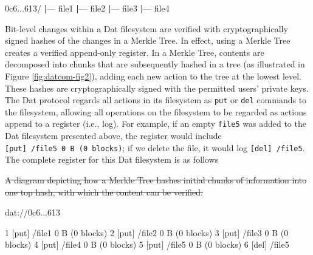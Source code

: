 \documentclass[publications,article,submit,moreauthors,pdftex,10pt,a4paper]{Definitions/mdpi}
\newenvironment{Shaded}{\begin{snugshade}}{\end{snugshade}}
\newcommand{\ExtensionTok}[1]{#1}
\newcommand{\KeywordTok}[1]{\textcolor[rgb]{0.13,0.29,0.53}{\textbf{#1}}}
\newcommand{\NormalTok}[1]{#1}
\providecommand{\DIFaddtex}[1]{{\protect\color{blue}\uwave{#1}}} %
\providecommand{\DIFdeltex}[1]{{\protect\color{red}\sout{#1}}}                      %
\providecommand{\DIFaddbegin}{} %
\providecommand{\DIFaddend}{} %
\providecommand{\DIFdelbegin}{} %
\providecommand{\DIFdelend}{} %
\providecommand{\DIFdelFL}[1]{\DIFdel{#1}} %
\providecommand{\DIFadd}[1]{\texorpdfstring{\DIFaddtex{#1}}{#1}} %
\providecommand{\DIFdel}[1]{\texorpdfstring{\DIFdeltex{#1}}{}} %
\newcommand{\DIFscaledelfig}{0.5}
\newlength{\DIFdelgraphicswidth} %
\newlength{\DIFdelgraphicsheight} %
\newcommand{\DIFaddincludegraphics}[2][]{{\color{blue}\fbox{\DIFOincludegraphics[#1]{#2}}}} %
\newcommand{\DIFdelincludegraphics}[2][]{%
\sbox{\DIFdelgraphicsbox}{\DIFOincludegraphics[#1]{#2}}%
\settoboxwidth{\DIFdelgraphicswidth}{\DIFdelgraphicsbox} %
\settoboxtotalheight{\DIFdelgraphicsheight}{\DIFdelgraphicsbox} %
\scalebox{\DIFscaledelfig}{%
\parbox[b]{\DIFdelgraphicswidth}{\usebox{\DIFdelgraphicsbox}\\[-\baselineskip] \rule{\DIFdelgraphicswidth}{0em}}\llap{\resizebox{\DIFdelgraphicswidth}{\DIFdelgraphicsheight}{%
\setlength{\unitlength}{\DIFdelgraphicswidth}%
\begin{picture}(1,1)%
\thicklines\linethickness{2pt} %
{\color[rgb]{1,0,0}\put(0,0){\framebox(1,1){}}}%
{\color[rgb]{1,0,0}\put(0,0){\line( 1,1){1}}}%
{\color[rgb]{1,0,0}\put(0,1){\line(1,-1){1}}}%
\end{picture}%
}\hspace*{3pt}}} %
} %
\DeclareRobustCommand{\DIFaddbegin}{\DIFOaddbegin \let\includegraphics\DIFaddincludegraphics} %
\DeclareRobustCommand{\DIFaddend}{\DIFOaddend \let\includegraphics\DIFOincludegraphics} %
\DeclareRobustCommand{\DIFdelbegin}{\DIFOdelbegin \let\includegraphics\DIFdelincludegraphics} %
\DeclareRobustCommand{\DIFdelend}{\DIFOaddend \let\includegraphics\DIFOincludegraphics} %
\begin{document}
\begin{Shaded}
\begin{Highlighting}[]
\ExtensionTok{0c6...613/}
\KeywordTok{|}\ExtensionTok{---}\NormalTok{ file1}
\KeywordTok{|}\ExtensionTok{---}\NormalTok{ file2}
\KeywordTok{|}\ExtensionTok{---}\NormalTok{ file3}
\KeywordTok{|}\ExtensionTok{---}\NormalTok{ file4}
\end{Highlighting}
\end{Shaded}

Bit-level changes within a Dat filesystem are verified with
cryptographically signed hashes of the changes in a Merkle Tree. In
effect, using a Merkle Tree creates a verified append-only
register. In a Merkle Tree, contents are decomposed into chunks that
are subsequently hashed in a tree (as illustrated in Figure
\ref{fig:datcom-fig2}), adding each new action to the tree at the
lowest level. These hashes are cryptographically signed with the
permitted users' private keys. The Dat protocol regards all actions in
its filesystem as \texttt{put} or \texttt{del} commands to the
filesystem, allowing all operations on the filesystem to be regarded
as actions \DIFaddbegin \DIFadd{to }\DIFaddend append to a register (i.e., log).  For example, if an
empty \texttt{file5} was added to the Dat filesystem presented above,
the register would include
\texttt{{[}put{]}\ /file5\ 0\ B\ (0\ blocks)}; if we delete the file,
it would log \texttt{{[}del{]}\ /file5}. The complete register for
this Dat filesystem is as follows

\DIFdelbegin %



{%
\DIFdelFL{A diagram depicting how a Merkle Tree hashes initial chunks of information into one top hash, with which the content can be verified.}}%

\DIFdelend \begin{Shaded}
\begin{Highlighting}[]
\ExtensionTok{dat}\NormalTok{://0c6...613}

\ExtensionTok{1}\NormalTok{ [put] /file1 0 B (0 blocks)}
\ExtensionTok{2}\NormalTok{ [put] /file2 0 B (0 blocks)}
\ExtensionTok{3}\NormalTok{ [put] /file3 0 B (0 blocks)}
\ExtensionTok{4}\NormalTok{ [put] /file4 0 B (0 blocks)}
\ExtensionTok{5}\NormalTok{ [put] /file5 0 B (0 blocks)}
\ExtensionTok{6}\NormalTok{ [del] /file5}
\end{Highlighting}
\end{Shaded}
\end{document}
